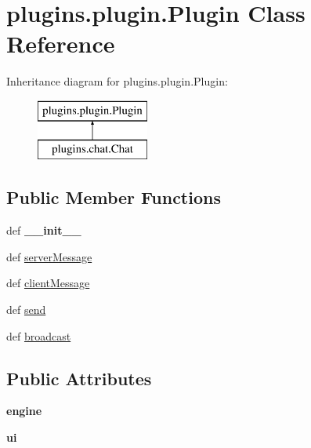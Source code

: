 \hypertarget{classplugins_1_1plugin_1_1_plugin}{\section{plugins.\-plugin.\-Plugin \-Class \-Reference}
\label{classplugins_1_1plugin_1_1_plugin}
}
\-Inheritance diagram for plugins.\-plugin.\-Plugin\-:\begin{figure}[H]
\begin{center}
\leavevmode
\includegraphics[height=2.000000cm]{classplugins_1_1plugin_1_1_plugin}
\end{center}
\end{figure}
\subsection*{\-Public \-Member \-Functions}
\begin{DoxyCompactItemize}
\item 
\hypertarget{classplugins_1_1plugin_1_1_plugin_a66f5c840ac03b9b724fb9734669abdfb}{def {\bfseries \-\_\-\-\_\-init\-\_\-\-\_\-}}\label{classplugins_1_1plugin_1_1_plugin_a66f5c840ac03b9b724fb9734669abdfb}

\item 
def \hyperlink{classplugins_1_1plugin_1_1_plugin_aac06ba69452a3dac4e5950116a34d3ac}{server\-Message}
\item 
def \hyperlink{classplugins_1_1plugin_1_1_plugin_a9647791e5ba3150f5fd82bb359a43d11}{client\-Message}
\item 
def \hyperlink{classplugins_1_1plugin_1_1_plugin_a977c6c1cb7ea7cbb54667f8264da135c}{send}
\item 
def \hyperlink{classplugins_1_1plugin_1_1_plugin_a030ec3807307c32b09dc91b8f4d3ede9}{broadcast}
\end{DoxyCompactItemize}
\subsection*{\-Public \-Attributes}
\begin{DoxyCompactItemize}
\item 
\hypertarget{classplugins_1_1plugin_1_1_plugin_a27cac3b42754566db40b9cb0109648b4}{{\bfseries engine}}\label{classplugins_1_1plugin_1_1_plugin_a27cac3b42754566db40b9cb0109648b4}

\item 
\hypertarget{classplugins_1_1plugin_1_1_plugin_aac6f72b7299d7727ad2e851fc49d7adb}{{\bfseries ui}}\label{classplugins_1_1plugin_1_1_plugin_aac6f72b7299d7727ad2e851fc49d7adb}

\end{DoxyCompactItemize}

